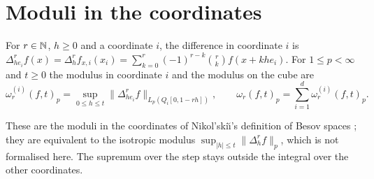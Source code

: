 \section{Moduli in the coordinates}

\begin{definition}
\label{def:cube-modulus}
\leanok
{}
For $r \in \mathbb{N}$, $h \geq 0$ and a coordinate $i$, the difference in coordinate $i$ is
$\Delta^r_{h e_i} f(x) = \Delta_h^r f_{x,i}(x_i) = \sum_{k=0}^r (-1)^{r-k} \binom{r}{k}
f(x + k h e_i)$. For $1 \leq p < \infty$ and $t \geq 0$ the modulus in coordinate $i$ and the
modulus on the cube are
\[
  \omega_r^{(i)}(f, t)_p = \sup_{0 \leq h \leq t} \|\Delta^r_{h e_i} f\|_{L_p(Q_i[0, 1 - rh])} ,
  \qquad
  \omega_r(f, t)_p = \sum_{i=1}^d \omega_r^{(i)}(f, t)_p .
\]
\end{definition}

These are the moduli in the coordinates of Nikol'ski\u{\i}'s definition of Besov spaces
\cite{Nikolskii}; they are equivalent to the isotropic modulus
$\sup_{|h| \leq t} \|\Delta_h^r f\|_p$, which is not formalised here. The supremum over the step
stays outside the integral over the other coordinates.

